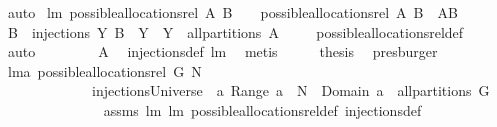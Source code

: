 \begin{isabellebody}
\ auto%
\endisatagproof
{\isafoldproof}%
%
\isadelimproof
\isanewline
%
\endisadelimproof
\isanewline
{}\isamarkupfalse%
\ lm{}{}{\isacharcolon}\ {\isachardoublequoteopen}possible{\isacharunderscore}allocations{\isacharunderscore}rel{\isacharprime}\ A\ B\ \ {\isacharequal}\ \ possible{\isacharunderscore}allocations{\isacharunderscore}rel\ A\ B{\isachardoublequoteclose}\ {\isacharparenleft}\ {\isachardoublequoteopen}{\isacharquery}A{\isacharequal}{\isacharquery}B{\isachardoublequoteclose}{\isacharparenright}\isanewline
%
\isadelimproof
%
\endisadelimproof
%
\isatagproof
{}\isamarkupfalse%
\ {\isacharminus}\isanewline
\ \ \isamarkupfalse%
\ {\isachardoublequoteopen}{\isacharquery}B{\isacharequal}{\isasymUnion}\ {\isacharbraceleft}\ injections\ Y\ B\ {\isacharbar}\ Y\ {\isachardot}\ Y\ {\isasymin}\ all{\isacharunderscore}partitions\ A\ {\isacharbraceright}{\isachardoublequoteclose}\isanewline
\ \ \isamarkupfalse%
\ possible{\isacharunderscore}allocations{\isacharunderscore}rel{\isacharunderscore}def\ \isamarkupfalse%
\ auto\ \isanewline
\ \ \isamarkupfalse%
\ \isamarkupfalse%
\ {\isachardoublequoteopen}{\isachardot}{\isachardot}{\isachardot}\ {\isacharequal}\ {\isacharquery}A{\isachardoublequoteclose}\ \isamarkupfalse%
\ injections{\isacharunderscore}def\ lm{}{}\ \isamarkupfalse%
\ metis\isanewline
\ \ \isamarkupfalse%
\ \isamarkupfalse%
\ {\isacharquery}thesis\ \isamarkupfalse%
\ presburger\isanewline
{}\isamarkupfalse%
%
\endisatagproof
{\isafoldproof}%
%
\isadelimproof
\isanewline
%
\endisadelimproof
\isanewline
{}\isamarkupfalse%
\ lm{}{}a{\isacharcolon}\ {\isachardoublequoteopen}possible{\isacharunderscore}allocations{\isacharunderscore}rel\ G\ N\ {\isasymsubseteq}\ \isanewline
\ \ \ \ \ \ \ \ \ \ \ \ \ injectionsUniverse\ {\isasyminter}\ {\isacharbraceleft}a{\isachardot}\ Range\ a\ {\isasymsubseteq}\ N\ {\isacharampersand}\ Domain\ a\ {\isasymin}\ all{\isacharunderscore}partitions\ G{\isacharbraceright}{\isachardoublequoteclose}\isanewline
%
\isadelimproof
\ \ \ \ \ \ \ \ \ \ \ \ \ %
\endisadelimproof
%
\isatagproof
{}\isamarkupfalse%
\ assms\ lm{}{}\ lm{}{}\ possible{\isacharunderscore}allocations{\isacharunderscore}rel{\isacharunderscore}def\ injections{\isacharunderscore}def\ \isamarkupfalse%

\end{isabellebody}
